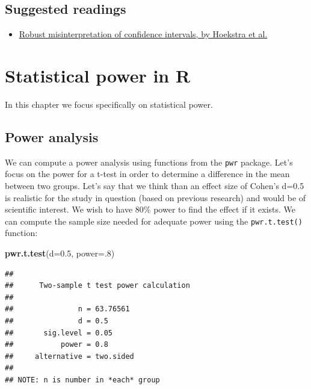 \documentclass[12pt,]{book}
\newenvironment{Shaded}{\begin{snugshade}}{\end{snugshade}}
\newcommand{\DataTypeTok}[1]{\textcolor[rgb]{0.13,0.29,0.53}{#1}}
\newcommand{\DecValTok}[1]{\textcolor[rgb]{0.00,0.00,0.81}{#1}}
\newcommand{\FloatTok}[1]{\textcolor[rgb]{0.00,0.00,0.81}{#1}}
\newcommand{\KeywordTok}[1]{\textcolor[rgb]{0.13,0.29,0.53}{\textbf{#1}}}
\newcommand{\NormalTok}[1]{#1}
\providecommand{\tightlist}{%
  \setlength{\itemsep}{0pt}\setlength{\parskip}{0pt}}
\begin{document}
\hypertarget{suggested-readings}{%
\section{Suggested readings}\label{suggested-readings}}

\begin{itemize}
\tightlist
\item
  \href{http://www.ejwagenmakers.com/inpress/HoekstraEtAlPBR.pdf}{Robust misinterpretation of confidence intervals, by Hoekstra et al.}
\end{itemize}

\hypertarget{statistical-power-in-r}{%
\chapter{Statistical power in R}\label{statistical-power-in-r}}

In this chapter we focus specifically on statistical power.

\hypertarget{power-analysis-1}{%
\section{Power analysis}\label{power-analysis-1}}

We can compute a power analysis using functions from the \texttt{pwr} package. Let's focus on the power for a t-test in order to determine a difference in the mean between two groups. Let's say that we think than an effect size of Cohen's d=0.5 is realistic for the study in question (based on previous research) and would be of scientific interest. We wish to have 80\% power to find the effect if it exists. We can compute the sample size needed for adequate power using the \texttt{pwr.t.test()} function:

\begin{Shaded}
\begin{Highlighting}[]
\KeywordTok{pwr.t.test}\NormalTok{(}\DataTypeTok{d=}\FloatTok{0.5}\NormalTok{, }\DataTypeTok{power=}\NormalTok{.}\DecValTok{8}\NormalTok{)}
\end{Highlighting}
\end{Shaded}

\begin{verbatim}
## 
##      Two-sample t test power calculation 
## 
##               n = 63.76561
##               d = 0.5
##       sig.level = 0.05
##           power = 0.8
##     alternative = two.sided
## 
## NOTE: n is number in *each* group
\end{verbatim}
\end{document}
